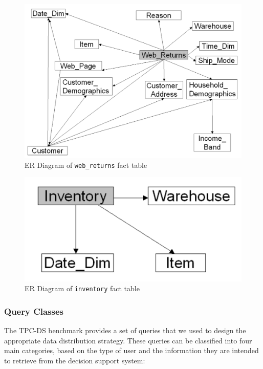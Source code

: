 \documentclass[conference]{IEEEtran}
\begin{document}
\begin{figure}[htbp]
    \centering
    \includegraphics[width=\linewidth]{figures/fact_table_web_returns.png}
    \caption{ER Diagram of \texttt{web\_returns} fact table }
    \label{fig:web_returns}
\end{figure}

\begin{figure}[htbp]
    \centering
    \includegraphics[width=\linewidth]{figures/fact_table_inventory.png}
    \caption{ER Diagram of \texttt{inventory} fact table }
    \label{fig:inventory}
\end{figure}

\subsubsection{Query Classes}

The TPC-DS benchmark provides a set of queries that we used to design the appropriate data distribution strategy. These queries can be classified into four main categories, based on the type of user and the information they are intended to retrieve from the decision support system:
\end{document}
